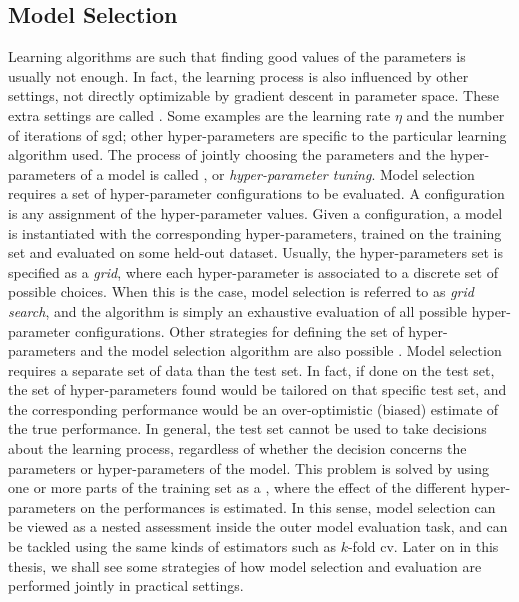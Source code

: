 \subsection{Model Selection}
Learning algorithms are such that finding good values of the parameters is usually not enough. In fact, the learning process is also influenced by other settings, not directly optimizable by gradient descent in parameter space. These extra settings are called . Some examples are the learning rate $\eta$ and the number of iterations of \gls{sgd}; other hyper-parameters are specific to the particular learning algorithm used. The process of jointly choosing the parameters and the hyper-parameters of a model is called , or \emph{hyper-parameter tuning}. Model selection requires a set of hyper-parameter configurations to be evaluated. A configuration is any assignment of the hyper-parameter values. Given a configuration, a model is instantiated with the corresponding hyper-parameters, trained on the training set and evaluated on some held-out dataset. Usually, the hyper-parameters set is specified as a \emph{grid}, where each hyper-parameter is associated to a discrete set of possible choices. When this is the case, model selection is referred to as \emph{grid search}, and the algorithm is simply an exhaustive evaluation of all possible hyper-parameter configurations. Other strategies for defining the set of hyper-parameters and the model selection algorithm are also possible \citep{bergstra2009randomsearch,bergstra2012hyperopt}. Model selection requires a separate set of data than the test set. In fact, if done on the test set, the set of hyper-parameters found would be tailored on that specific test set, and the corresponding performance would be an over-optimistic (biased) estimate of the true performance. In general, the test set cannot be used to take decisions about the learning process, regardless of whether the decision concerns the parameters or hyper-parameters of the model. This problem is solved by using one or more parts of the training set as a , where the effect of the different hyper-parameters on the performances is estimated. In this sense, model selection can be viewed as a nested assessment inside the outer model evaluation task, and can be tackled using the same kinds of estimators such as $k$-fold \gls{cv}. Later on in this thesis, we shall see some strategies of how model selection and evaluation are performed jointly in practical settings.

